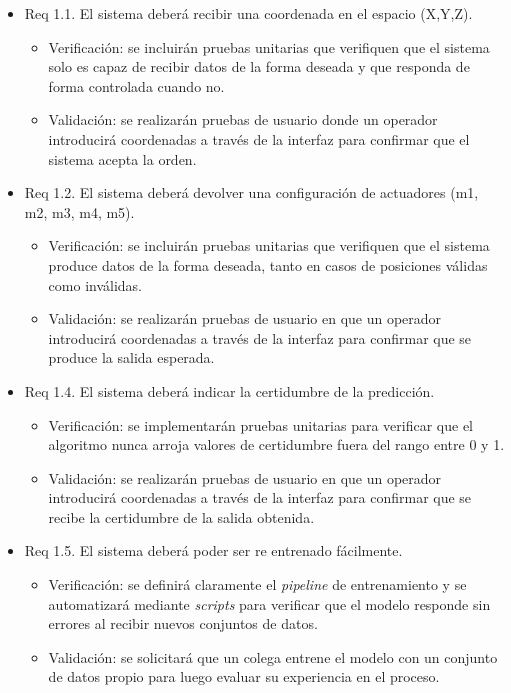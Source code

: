 \documentclass[
11pt, %
]{charter}
\begin{document}
\begin{itemize} 

\item Req 1.1. El sistema deberá recibir una coordenada en el espacio (X,Y,Z).
\begin{itemize}
	\item Verificación: se incluirán pruebas unitarias que verifiquen que el sistema solo es capaz de recibir datos de la forma deseada y que responda de forma controlada cuando no.
	\item Validación: se realizarán pruebas de usuario donde un operador introducirá coordenadas a través de la interfaz para confirmar que el sistema acepta la orden.
\end{itemize}

\item Req 1.2. El sistema deberá devolver una configuración de actuadores (m1, m2, m3, m4, m5).
\begin{itemize}
	\item Verificación: se incluirán pruebas unitarias que verifiquen que el sistema produce datos de la forma deseada, tanto en casos de posiciones válidas como inválidas.
	\item Validación: se realizarán pruebas de usuario en que un operador introducirá coordenadas a través de la interfaz para confirmar que se produce la salida esperada.
\end{itemize}

\item Req 1.4. El sistema deberá indicar la certidumbre de la predicción.
\begin{itemize}
	\item Verificación: se implementarán pruebas unitarias para verificar que el algoritmo nunca arroja valores de certidumbre fuera del rango entre 0 y 1.
	\item Validación: se realizarán pruebas de usuario en que un operador introducirá coordenadas a través de la interfaz para confirmar que se recibe la certidumbre de la salida obtenida.
\end{itemize}

\item Req 1.5. El sistema deberá poder ser re entrenado fácilmente.
\begin{itemize}
	\item Verificación: se definirá claramente el \textit{pipeline} de entrenamiento y se automatizará mediante \textit{scripts} para verificar que el modelo responde sin errores al recibir nuevos conjuntos de datos.
	\item Validación: se solicitará que un colega entrene el modelo con un conjunto de datos propio para luego evaluar su experiencia en el proceso.
\end{itemize}


\end{itemize}
\end{document}
